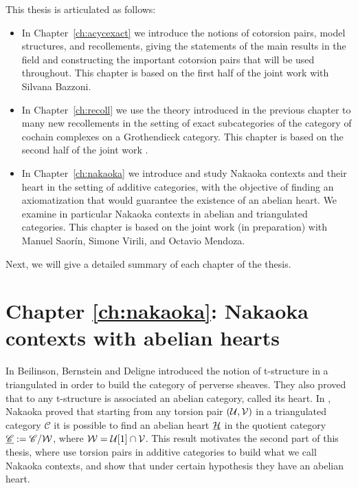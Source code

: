 This thesis is articulated as follows:
\begin{itemize}
  \item In Chapter~\ref{ch:acycexact} we introduce the notions of cotorsion pairs, model structures, and recollements, giving the statements of the main results in the field and constructing the important cotorsion pairs that will be used throughout. This chapter is based on the first half of the joint work \cite{bazzoni2018recollements} with Silvana Bazzoni.
  \item In Chapter~\ref{ch:recoll} we use the theory introduced in the previous chapter to many new recollements in the setting of exact subcategories of the category of cochain complexes on a Grothendieck category. This chapter is based on the second half of the joint work \cite{bazzoni2018recollements}.
  \item In Chapter~\ref{ch:nakaoka} we introduce and study Nakaoka contexts and their heart in the setting of additive categories, with the objective of finding an axiomatization that would guarantee the existence of an abelian heart. We examine in particular Nakaoka contexts in abelian and triangulated categories. This chapter is based on the joint work (in preparation) \cite{mstv2018} with Manuel Saor\'in, Simone Virili, and Octavio Mendoza.
\end{itemize}

Next, we will give a detailed summary of each chapter of the thesis.

\section*{Chapter \ref{ch:nakaoka}: Nakaoka contexts with abelian hearts}


In \cite{bbd82} Beilinson, Bernstein and Deligne introduced the notion of t-structure in a triangulated in order to build the category of perverse sheaves. They also proved that to any t-structure is associated an abelian category, called its heart. In \cite{Nakaoka}, Nakaoka proved that starting from any torsion pair $(\mathcal{U},\mathcal{V})$ in a triangulated category $\mathscr{C}$ it is possible to find an abelian heart $\underline{\mathcal{H}}$ in the quotient category $\underline{\mathscr{C}}:=\mathscr{C}/\mathcal{W}$, where $\mathcal{W}=\mathcal{U}[1]\cap\mathcal{V}$. This result motivates the second part of this thesis, where use torsion pairs in additive categories to build what we call Nakaoka contexts, and show that under certain hypothesis they have an abelian heart.

